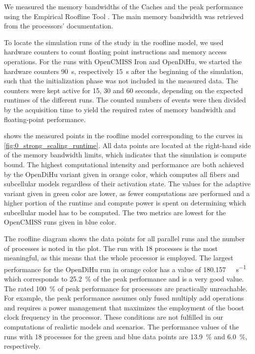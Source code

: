 We measured the memory bandwidths of the Caches and the peak performance using the Empirical Roofline Tool \cite{ert}. The main memory bandwidth was retrieved from the processors' documentation.

To locate the simulation runs of the study in the roofline model, we used hardware counters to count floating point instructions and memory access operations.
For the runs with OpenCMISS Iron and OpenDiHu, we started the hardware counters \SI{90}{\second}, respectively \SI{15}{\second} after the beginning of the simulation, such that the initialization phase was not included in the measured data. The counters were kept active for 15, 30 and 60 seconds, depending on the expected runtimes of the different runs. The counted numbers of events were then divided by the acquisition time to yield the required rates of memory bandwidth and floating-point performance.

 shows the measured points in the roofline model corresponding to the curves in \cref{fig:0_strong_scaling_runtime}. All data points are located at the right-hand side of the memory bandwidth limits, which indicates that the simulation is compute bound. 
The highest computational intensity and performance are both achieved by the OpenDiHu variant given in orange color, which computes all fibers and subcellular models regardless of their activation state. The values for the adaptive variant given in green color are lower, as fewer computations are performed and a higher portion of the runtime and compute power is spent on determining which subcellular model has to be computed. The two metrics are lowest for the OpenCMISS runs given in blue color.

The roofline diagram shows the data points for all parallel runs and the number of processes is noted in the plot. The run with 18 processes is the most meaningful, as this means that the whole processor is employed. The largest performance for the OpenDiHu run in orange color has a value of \SI{180.157}{\giga\flop\per\second} which corresponds to \SI{25.2}{\percent} of the peak performance and is a very good value. The rated \SI{100}{\percent} of peak performance for processors are practically unreachable. For example, the peak performance assumes only fused multiply add operations and requires a power management that maximizes the employment of the boost clock frequency in the processor. These conditions are not fulfilled in our computations of realistic models and scenarios.
The performance values of the runs with 18 processes for the green and blue data points are \SI{13.9}{\percent} and \SI{6.0}{\percent}, respectively. 


